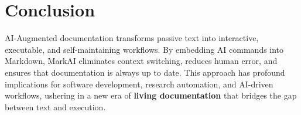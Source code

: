 \documentclass{article}
\begin{document}
\section{Conclusion}
AI-Augmented documentation transforms passive text into interactive, executable, and self-maintaining workflows. By embedding AI commands into Markdown, MarkAI eliminates context switching, reduces human error, and ensures that documentation is always up to date. This approach has profound implications for software development, research automation, and AI-driven workflows, ushering in a new era of \textbf{living documentation} that bridges the gap between text and execution.



\end{document}
